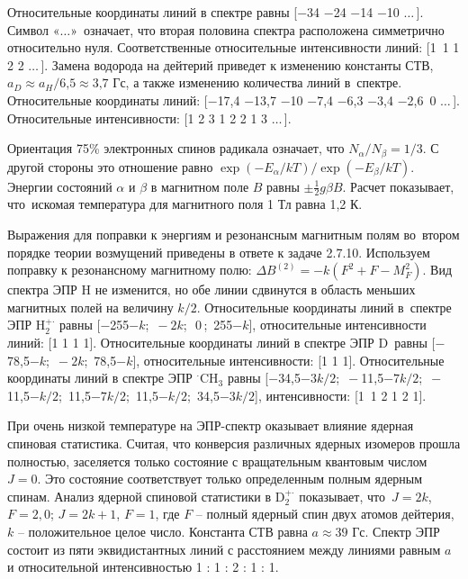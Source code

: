  Относительные координаты линий в спектре равны [$-$34 $-$24 $-$14 $-$10 $\ldots\,$]. Символ «$\ldots$»$\,$ означает, что вторая половина спектра расположена симметрично относительно нуля. Соответственные относительные интенсивности линий: [1~1 1 2 2 $\ldots\,$]. Замена водорода на дейтерий приведет к изменению константы СТВ, $a_D \approx a_H / \text{6,5} \approx \text{3,7}$ Гс, а также изменению количества линий в~спектре. Относительные координаты линий: [$-$17,4 $-$13,7 $-$10 $-$7,4 $-$6,3 $-$3,4 $-$2,6$\,$ 0 $\ldots\,$]. Относительные интенсивности: [1 2 3 1 2 2 1 3 $\ldots\,$].\par
{} Ориентация 75\% электронных спинов радикала означает, что $N_{\alpha}/N_{\beta} = 1/3$. С другой стороны это отношение равно $\exp{ \left( -E_{\alpha}/kT \right) } / \exp{ \left( -E_{\beta}/kT \right) }$. Энергии состояний $\alpha$ и $\beta$ в магнитном поле $B$ равны $\pm \frac12 g \beta B$. Расчет показывает, что~искомая температура для магнитного поля 1 Тл равна 1,2 К.\par
{} Выражения для поправки к энергиям и резонансным магнитным полям во~втором порядке теории возмущений приведены в ответе к задаче 2.7.10. Используем поправку к резонансному магнитному полю: $\Delta B^{(2)} = -k\left( F^2 + F - M_F^2 \right)$. Вид спектра ЭПР $\text{H}$ не изменится, но обе линии сдвинутся в область меньших магнитных полей на величину $k/2$. Относительные координаты линий в~спектре ЭПР $\text{H}_2^{+\boldsymbol{\cdot}}$ равны [$-$255$-k$; $\,-2k$; $\,\,0\,$; $\,$255$-k$], относительные интенсивности линий: [1 1 1 1]. Относительные координаты линий в спектре ЭПР $\text{D}$~равны [$-$78,5$-k$; $\,-2k$; $\,$78,5$-k$], относительные интенсивности: [1 1 1]. Относительные координаты линий в спектре ЭПР $^{\boldsymbol{\cdot}}\text{CH}_3$ равны [$-$34,5$-3k/2$; $\,-$11,5$-7k/2$; $\,-$11,5$-k/2$; $\,$11,5$-7k/2$; $\,$11,5$-k/2$; $\,$34,5$-3k/2$], интенсивности: [1~1 2 1 2 1].\par
{} При очень низкой температуре на ЭПР-спектр оказывает влияние ядерная спиновая статистика. Считая, что конверсия различных ядерных изомеров прошла полностью, заселяется только состояние с вращательным квантовым числом $J=0$. Это состояние соответствует только определенным полным ядерным спинам.
Анализ ядерной спиновой статистики в $\text{D}_2^{+\boldsymbol{\cdot}}$ показывает, что~$J=2k$, $F=2\text{,}\, 0$; $J=2k+1$, $F=1$, где $F$ – полный ядерный спин двух атомов дейтерия, $k$ – положительное целое число. Константа СТВ равна $a \approx \text{39}$ Гс. Спектр ЭПР состоит из пяти эквидистантных линий с расстоянием между линиями равным $a$ и относительной интенсивностью 1 : 1 : 2 : 1 : 1.\par
